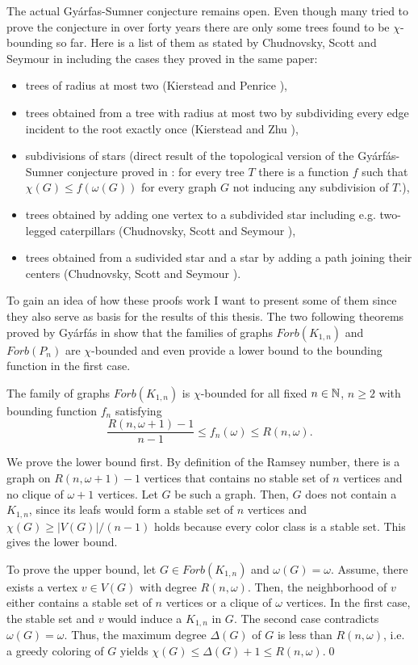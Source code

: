 The actual Gyárfas-Sumner conjecture remains open. Even though many tried to prove the conjecture in over forty years there are only some trees found to be $\chi$-bounding so far. Here is a list of them as stated by Chudnovsky, Scott and Seymour in \cite{CSS17} including the cases they proved in the same paper:

\begin{itemize}
\item trees of radius at most two (Kierstead and Penrice \cite{Ki94}),
\item trees obtained from a tree with radius at most two by subdividing every edge incident to the root exactly once (Kierstead and Zhu \cite{Ki04}),
\item subdivisions of stars (direct result of the topological version of the Gyárfás-Sumner conjecture proved in \cite{Sc97}: for every tree $T$ there is a function $f$ such that $\chi (G)\leq f(\omega (G))$ for every graph $G$ not inducing any subdivision of $T$.),
\item trees obtained by adding one vertex to a subdivided star including e.g. two-legged caterpillars (Chudnovsky, Scott and Seymour \cite{CSS17}),
\item trees obtained from a sudivided star and a star by adding a path joining their centers (Chudnovsky, Scott and Seymour \cite{CSS17}).
\end{itemize} 

To gain an idea of how these proofs work I want to present some of them since they also serve as basis for the results of this thesis. The two following theorems proved by Gyárfás in \cite{Gy87} show that the families of graphs $\textit{Forb}(K_{1,n})$ and $\textit{Forb}(P_n)$ are $\chi$-bounded and even provide a lower bound to the bounding function in the first case.

\begin{thm} The family of graphs $\textit{Forb}(K_{1,n})$ is $\chi$-bounded for all fixed $n \in\mathbb{N}$, $n\geq 2$ with bounding function $f_n$ satisfying \[\dfrac{R(n,\omega + 1) - 1}{n-1}\leq f_n(\omega )\leq R(n,\omega ).\] 
\end{thm}
\begin{prf}
We prove the lower bound first. By definition of the Ramsey number, there is a graph on $R(n,\omega + 1) - 1$ vertices that contains no stable set of $n$ vertices and no clique of $\omega + 1$ vertices. Let $G$ be such a graph. Then, $G$ does not contain a $K_{1,n}$, since its leafs would form a stable set of $n$ vertices and $\chi (G)\geq |V(G)| /(n-1)$ holds because every color class is a stable set. This gives the lower bound.

To prove the upper bound, let $G \in\textit{Forb} (K_{1,n})$ and $\omega (G) = \omega$. Assume, there exists a vertex $v\in V(G)$ with degree $R(n,\omega)$. Then, the neighborhood of $v$ either contains a stable set of $n$ vertices or a clique of $\omega$ vertices. In the first case, the stable set and $v$ would induce a $K_{1,n}$ in $G$. The second case contradicts $\omega (G) = \omega$. Thus, the maximum degree $\Delta (G)$ of $G$ is less than $R(n,\omega)$, i.e. a greedy coloring of $G$ yields $\chi (G)\leq\Delta (G) + 1\leq R(n,\omega)$.\qed
\end{prf}

